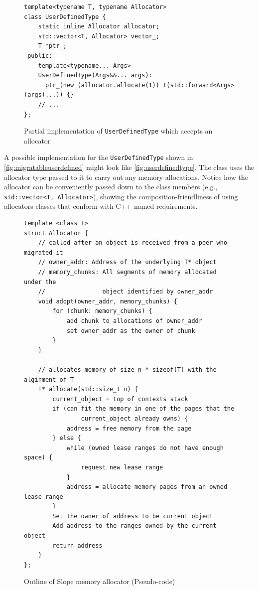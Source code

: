 \begin{figure}[t]
\begin{lstlisting}
template<typename T, typename Allocator>
class UserDefinedType {
    static inline Allocator allocator;
    std::vector<T, Allocator> vector_;
    T *ptr_;
 public:
    template<typename... Args>
    UserDefinedType(Args&&... args):
      ptr_(new (allocator.allocate(1)) T(std::forward<Args>(args)...)) {}
    // ...
};
\end{lstlisting}
\caption{ Partial implementation of \texttt{UserDefinedType} which accepts an allocator}
\label{fig:userdefinedtype}
\end{figure}


A possible implementation for the \texttt{UserDefinedType} shown in
\autoref{fig:migratableuserdefined} might look like \autoref{fig:userdefinedtype}.
The class uses the allocator type passed to it to carry out any memory
allocations. Notice how the allocator can be conveniently passed down to the
class members (e.g., \texttt{std::vector<T, Allocator>}), showing the
composition-friendliness of using allocators classes that conform with C++ named
requirements.


\begin{figure}[tp]
\begin{lstlisting}
template <class T>
struct Allocator {
    // called after an object is received from a peer who migrated it
    // owner_addr: Address of the underlying T* object
    // memory_chunks: All segments of memory allocated under the
    //                object identified by owner_addr
    void adopt(owner_addr, memory_chunks) {
        for (chunk: memory_chunks) {
            add chunk to allocations of owner_addr
            set owner_addr as the owner of chunk
        }
    }

    // allocates memory of size n * sizeof(T) with the alginment of T
    T* allocate(std::size_t n) {
        current_object = top of contexts stack
        if (can fit the memory in one of the pages that the
                current_object already owns) {
            address = free memory from the page
        } else {
            while (owned lease ranges do not have enough space) {
                request new lease range
            }
            address = allocate memory pages from an owned lease range
        }
        Set the owner of address to be current object
        Add address to the ranges owned by the current object
        return address
    }
};
\end{lstlisting}
    \caption{ Outline of Slope memory allocator (Pseudo-code) }
\label{fig:allocimpl}
\end{figure}


